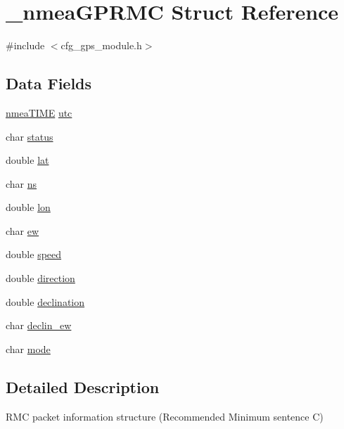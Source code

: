 \hypertarget{struct__nmea_g_p_r_m_c}{}\section{\+\_\+nmea\+G\+P\+R\+MC Struct Reference}
\label{struct__nmea_g_p_r_m_c}


{\ttfamily \#include $<$cfg\+\_\+gps\+\_\+module.\+h$>$}

\subsection*{Data Fields}
\begin{DoxyCompactItemize}
\item 
\hyperlink{cfg__gps__module_8h_a02bf9ae5b3df2ced0b3406a214735cb2}{nmea\+T\+I\+ME} \hyperlink{struct__nmea_g_p_r_m_c_a3ddf15855460a4cadc548d695ca841dd}{utc}
\item 
char \hyperlink{struct__nmea_g_p_r_m_c_a051c9e198ee930358372c407a17e8b78}{status}
\item 
double \hyperlink{struct__nmea_g_p_r_m_c_a7972334534f68166121a6e51b0aac2d6}{lat}
\item 
char \hyperlink{struct__nmea_g_p_r_m_c_affa71e2abbbf0ff7b001d574d93dd8ca}{ns}
\item 
double \hyperlink{struct__nmea_g_p_r_m_c_aa96391e04b5977c50b96d77bea86a01d}{lon}
\item 
char \hyperlink{struct__nmea_g_p_r_m_c_ad902b5b8ca288e6bf6b0e5a0321a0847}{ew}
\item 
double \hyperlink{struct__nmea_g_p_r_m_c_a6dc6e6f3c75c509ce943163afb5dade7}{speed}
\item 
double \hyperlink{struct__nmea_g_p_r_m_c_a8da9718bd3d0396135453cbb12751a5b}{direction}
\item 
double \hyperlink{struct__nmea_g_p_r_m_c_a97780ae452ef3641542664e9f353a505}{declination}
\item 
char \hyperlink{struct__nmea_g_p_r_m_c_a697ecb96f499e3b99c6a460615284323}{declin\+\_\+ew}
\item 
char \hyperlink{struct__nmea_g_p_r_m_c_a000e34997df38c2005a83d63e67d9282}{mode}
\end{DoxyCompactItemize}


\subsection{Detailed Description}
R\+MC packet information structure (Recommended Minimum sentence C) 

